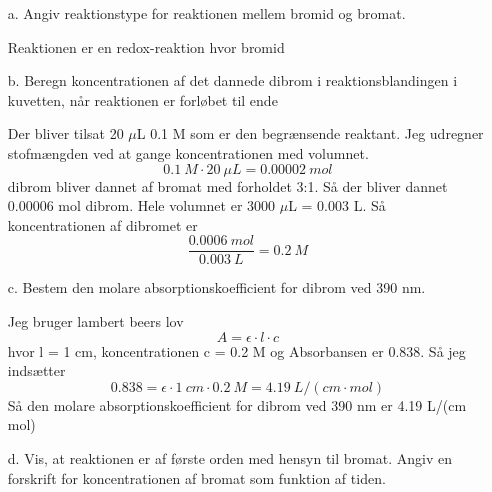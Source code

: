 \documentclass[12pt]{article}
\begin{document}
\begin{enumerate}

        \item[a.] Angiv reaktionstype for reaktionen mellem bromid og bromat.
                
                Reaktionen er en redox-reaktion hvor bromid

        \item[b.] Beregn koncentrationen af det dannede dibrom i reaktionsblandingen i kuvetten, når reaktionen er forløbet til ende

                Der bliver tilsat 20 $\mu$L 0.1 M  som er den begrænsende reaktant. Jeg udregner stofmængden ved at gange
                koncentrationen med volumnet.
                $$0.1\ M\cdot 20\ \mu L = 0.00002\ mol$$
                dibrom bliver dannet af bromat med forholdet 3:1. Så der bliver dannet 0.00006 mol dibrom. Hele volumnet
                er 3000 $\mu$L = 0.003 L. Så koncentrationen af dibromet er
                $$\frac{0.0006\ mol}{0.003\ L} = 0.2\ M$$

        \item[c.] Bestem den molare absorptionskoefficient for dibrom ved 390 nm.

                Jeg bruger lambert beers lov
                $$A = \epsilon \cdot l \cdot c$$
                hvor l = 1 cm, koncentrationen c = 0.2 M og Absorbansen er 0.838. Så jeg indsætter
                $$0.838 = \epsilon \cdot 1\ cm\cdot 0.2\ M = 4.19\ L/(cm\cdot mol)$$
                Så den molare absorptionskoefficient for dibrom ved 390 nm er 4.19 L/(cm mol)

        \item[d.] Vis, at reaktionen er af første orden med hensyn til bromat.
                Angiv en forskrift for koncentrationen af bromat som funktion af tiden.


\end{enumerate}
\end{document}
